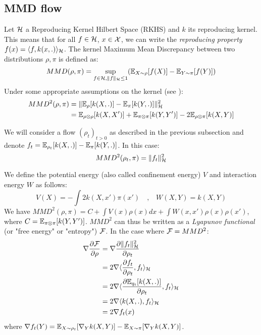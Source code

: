 \subsection{MMD flow}



Let ${{\mathcal H}}$ a Reproducing Kernel Hilbert Space (RKHS) and $k$ its reproducing kernel. This means that for all $f \in {{\mathcal H}}$, $x \in {{\mathcal X}}$, we can write the \textit{reproducing property} $f(x)=\langle f, k(x,.) \rangle_{{{\mathcal H}}}$. The kernel Maximum Mean Discrepancy between two distributions $\rho,\pi$ is defined as:
\begin{equation}
MMD(\rho,\pi)=\sup_{f \in {{\mathcal H}},  \|f\|_{{{\mathcal H}}}\le 1} ({{\mathbb E}}_{X \sim \rho}[f(X)]-{{\mathbb E}}_{Y \sim \pi}[f(Y)])
\end{equation}
Under some appropriate assumptions on the kernel (see \cite{gretton2012kernel}):
\begin{align}
MMD^2(\rho,\pi)&=\|{{\mathbb E}}_{\rho}[k(X,.)] - {{\mathbb E}}_{\pi}[k(Y,.)]\|^2_{{{\mathcal H}}}\\
&={{\mathbb E}}_{\rho \otimes \rho}[k(X,X')]+{{\mathbb E}}_{\pi \otimes \pi}[k(Y,Y')] - 2{{\mathbb E}}_{\rho \otimes \pi}[k(X,Y)]
\end{align}

We will consider a flow $(\rho_t)_{t>0}$ as described in the previous subsection and denote $f_t= {{\mathbb E}}_{\rho_t}[k(X,.)]- {{\mathbb E}}_{\pi}[k(Y,.)]$. In this case:
\begin{equation}
MMD^2(\rho_t,\pi)=\|f_t\|^2_{{{\mathcal H}}}
\end{equation} 

We define the potential energy (also called confinement energy) $V$ and interaction energy $W$ as follows:
\begin{equation}
V(X)=-\int 2 k(X,x')\pi(x') \quad \text{,} \quad
W(X,Y)=k(X,Y)
\end{equation}
We have $MMD^2(\rho,\pi)=C+ \int V(x) \rho(x)dx + \int W(x,x')\rho(x)\rho(x')$, where $C={{\mathbb E}}_{\pi\otimes \pi}[k(Y,Y')]$. $MMD^2$ can thus be written as a \textit{Lyapunov functional} (or "free energy" or "entropy") ${{\mathcal F}}$.
In the case where ${{\mathcal F}}=MMD^2$:
\begin{align}
\nabla \frac{\partial {{\mathcal F}}}{\partial \rho}&= \nabla \frac{\partial \|f_t\|^2_{{{\mathcal H}}}}{\partial \rho_t}\\
&=2 \nabla \langle \frac{\partial f_t}{\partial \rho_t}, f_t \rangle_{{{\mathcal H}}}\\
&=2 \nabla \langle \frac{\partial {{\mathbb E}}_{q_t}[k(X,.)]}{\partial \rho_t}, f_t \rangle_{{{\mathcal H}}}\\
&=2 \nabla \langle k(X,.), f_t \rangle_{{{\mathcal H}}}\\
&= 2 \nabla f_t(x)
\end{align}
where $\nabla f_t(Y)= {{\mathbb E}}_{X \sim \rho_t}[\nabla_{Y}k(X,Y)] -  {{\mathbb E}}_{X \sim \pi}[\nabla_{Y}k(X,Y)]$. 

